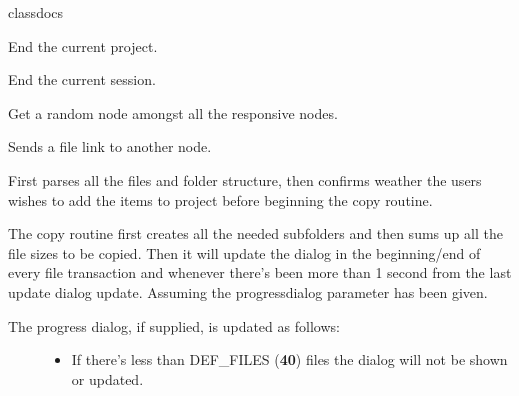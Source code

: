 \documentclass[letterpaper,10pt,english]{sphinxmanual}
\begin{document}
\begin{fulllineitems}
\label{state:state.State}
classdocs

\begin{fulllineitems}
\label{state:state.State.end_current_project}
End the current project.

\end{fulllineitems}


\begin{fulllineitems}
\label{state:state.State.end_current_session}
End the current session.

\end{fulllineitems}


\begin{fulllineitems}
\label{state:state.State.get_random_responsive}
Get a random node amongst all the responsive nodes.

\end{fulllineitems}


\begin{fulllineitems}
\label{state:state.State.handle_file_send}
Sends a file link to another node.

First parses all the files and folder structure, then confirms weather
the users wishes to add the items to project before beginning the copy
routine.

The copy routine first creates all the needed subfolders and then sums
up all the file sizes to be copied. Then it will update the dialog
in the beginning/end of every file transaction and whenever there's
been more than 1 second from the last update dialog update. Assuming
the progressdialog parameter has been given.
\begin{description}
\item[{The progress dialog, if supplied, is updated as follows:}] \leavevmode\begin{itemize}
\item {} 
If there's less than DEF\_FILES (\textbf{40}) files the dialog             will not be shown or updated.


\end{itemize}
\end{description}
\end{fulllineitems}
\end{fulllineitems}
\end{document}
